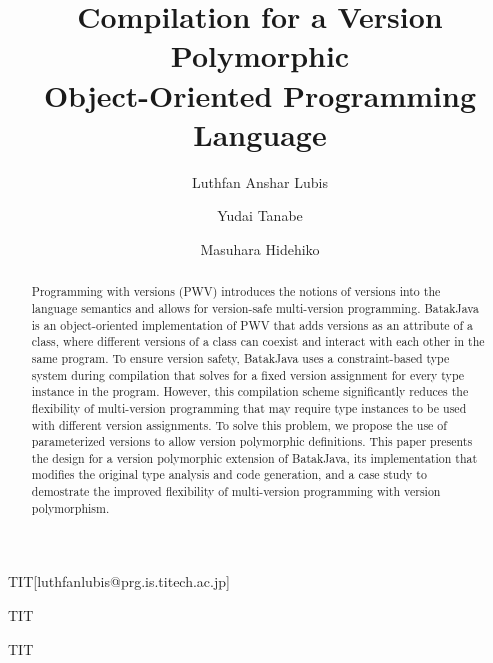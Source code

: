 \documentclass[english,preprint,JIP]{ipsj}
\begin{document}
\title{Compilation for a Version Polymorphic\\Object-Oriented Programming Language}


\author{Luthfan Anshar Lubis}{TIT}[luthfanlubis@prg.is.titech.ac.jp]
\author{Yudai Tanabe}{TIT}
\author{Masuhara Hidehiko}{TIT}


\begin{abstract}

Programming with versions (PWV) introduces the notions of versions into the 
language semantics and allows for version-safe multi-version programming. 
BatakJava is an object-oriented implementation of PWV that adds versions 
as an attribute of a class, where different versions of a class can coexist and 
interact with each other in the same program. 
To ensure version safety, BatakJava uses a constraint-based type system during 
compilation that 
solves for a fixed version assignment for every type instance in the program.
However, this compilation scheme significantly reduces the flexibility of 
multi-version programming that may require type instances to be used with 
different version assignments.
To solve this problem, we propose the use of parameterized versions to allow 
version polymorphic definitions. 
This paper presents the design for a version polymorphic extension of BatakJava, 
its implementation that modifies the original type analysis and code generation, 
and a case study to demostrate the improved flexibility of multi-version 
programming with version polymorphism.
\end{abstract}
\end{document}
